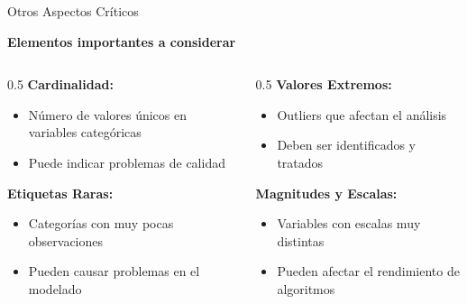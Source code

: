 \documentclass{beamer}
\begin{document}
\begin{frame}{Otros Aspectos Críticos}
    \begin{center}
        \textbf{Elementos importantes a considerar}
    \end{center}
    
    \vspace{0.5cm}
    
    \begin{columns}
        \begin{column}{0.5\textwidth}
            \textbf{Cardinalidad:}
            \begin{itemize}
                \item Número de valores únicos en variables categóricas
                \item Puede indicar problemas de calidad
            \end{itemize}
            
            \vspace{0.3cm}
            
            \textbf{Etiquetas Raras:}
            \begin{itemize}
                \item Categorías con muy pocas observaciones
                \item Pueden causar problemas en el modelado
            \end{itemize}
        \end{column}
        \begin{column}{0.5\textwidth}
            \textbf{Valores Extremos:}
            \begin{itemize}
                \item Outliers que afectan el análisis
                \item Deben ser identificados y tratados
            \end{itemize}
            
            \vspace{0.3cm}
            
            \textbf{Magnitudes y Escalas:}
            \begin{itemize}
                \item Variables con escalas muy distintas
                \item Pueden afectar el rendimiento de algoritmos
            \end{itemize}
        \end{column}
    \end{columns}
\end{frame}
\end{document}
